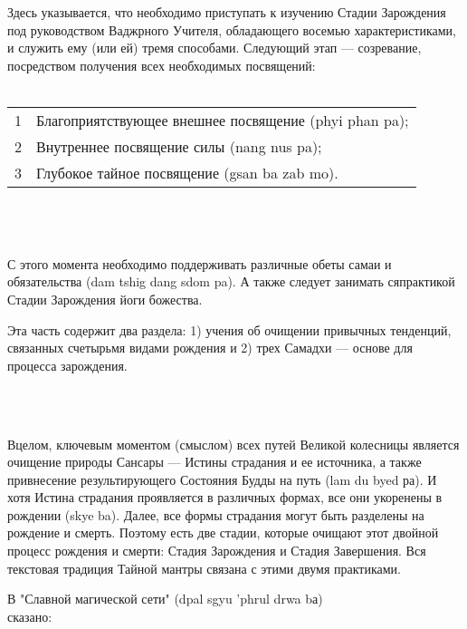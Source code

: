 Здесь указывается, что необходимо приступать к изучению Стадии Зарождения под
руководством Ваджрного Учителя, обладающего восемью характеристиками, и служить ему
(или ей) тремя способами. Следующий этап — созревание, посред\-ством получения всех
необходимых посвящений:\\
\\
\begin{tabular}{ll}
1 & Благоприятствующее внешнее посвящение (phyi phan pa);\\
2 & Внутреннее посвящение силы (nang nus pa);\\
3 & Глубокое тайное посвящение (gsan ba zab mo).\\
\end{tabular}
\\
\\
\\
С этого момента необходимо поддерживать различные обеты самаи и обязательства
(dam tshig dang sdom pa). А также следует занимать сяпрактикой Стадии Зарождения йоги
божества.\\

\begin{siderules}
Эта часть содержит два раздела: 1) учения об очищении привычных тенденций, связанных счетырьмя видами рождения и
2) трех Самадхи — основе для процесса зарождения.
\end{siderules}
\\
\\
\newpage

\Vspace{1cm}
\begin{siderules}
Вцелом, ключевым моментом (смыслом) всех путей Великой колесницы является очищение
природы Сансары — Истины страдания и ее источника, а также привнесение
результи\-рующего Состояния Будды на путь (lam du byed ра). И хотя Истина страдания
проявляется в различных формах, все они укоренены в рождении (skye ba).
Далее, все формы страдания могут быть разделены на рождение и смерть.
Поэтому есть две стадии, которые очищают этот двойной процесс рождения и смерти:
Стадия Зарождения и Стадия Завершения. Вся текстовая традиция Тайной мантры
связана с этими двумя практиками.
\end{siderules}

В "Славной магической сети" (dpal sgyu 'phrul drwa bа)\\ сказано:\\

